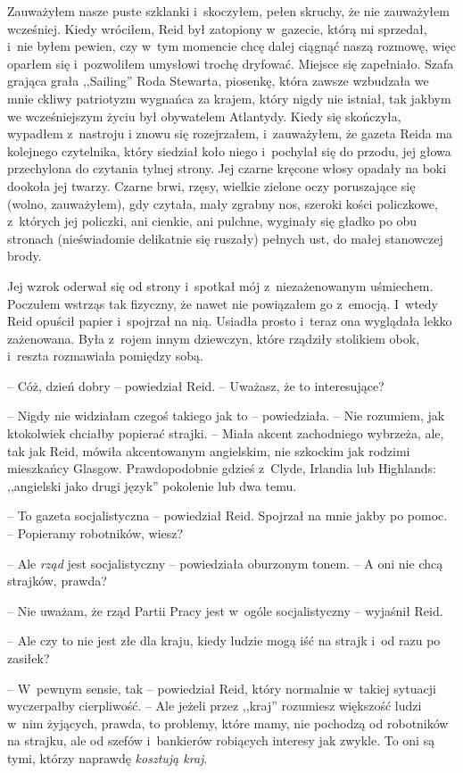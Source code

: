 \documentclass[oneside,polish,11pt,sfheadings]{mwbk}
\begin{document}
Zauważyłem nasze puste szklanki i~skoczyłem, pełen skruchy, że nie
zauważyłem wcześniej. Kiedy wróciłem, Reid był zatopiony w~gazecie,
którą mi sprzedał, i~nie byłem pewien, czy w~tym momencie chcę dalej
ciągnąć naszą rozmowę, więc oparłem się i~pozwoliłem umysłowi trochę
dryfować. Miejsce się zapełniało. Szafa grająca grała ,,Sailing'' Roda
Stewarta, piosenkę, która zawsze wzbudzała we mnie ckliwy patriotyzm
wygnańca za krajem, który nigdy nie istniał, tak jakbym we wcześniejszym
życiu był obywatelem Atlantydy. Kiedy się skończyła, wypadłem z~nastroju
i znowu się rozejrzałem, i~zauważyłem, że gazeta Reida ma kolejnego
czytelnika, który siedział koło niego i~pochylał się do przodu, jej
głowa przechylona do czytania tylnej strony. Jej czarne kręcone włosy
opadały na boki dookoła jej twarzy. Czarne brwi, rzęsy, wielkie zielone
oczy poruszające się (wolno, zauważyłem), gdy czytała, mały zgrabny nos,
szeroki kości policzkowe, z~których jej policzki, ani cienkie, ani
pulchne, wyginały się gładko po obu stronach (nieświadomie delikatnie
się ruszały) pełnych ust, do małej stanowczej brody.

Jej wzrok oderwał się od strony i~spotkał mój z~niezażenowanym
uśmiechem. Poczułem wstrząs tak fizyczny, że nawet nie powiązałem go z~emocją. I~wtedy Reid opuścił papier i~spojrzał na nią. Usiadła prosto i~teraz ona wyglądała lekko zażenowana. Była z~rojem innym dziewczyn,
które rządziły stolikiem obok, i~reszta rozmawiała pomiędzy sobą.

-- Cóż, dzień dobry -- powiedział Reid. -- Uważasz, że to interesujące?

-- Nigdy nie widziałam czegoś takiego jak to -- powiedziała. -- Nie
rozumiem, jak ktokolwiek chciałby popierać strajki. -- Miała akcent
zachodniego wybrzeża, ale, tak jak Reid, mówiła akcentowanym angielskim,
nie szkockim jak rodzimi mieszkańcy Glasgow. Prawdopodobnie gdzieś z~Clyde, Irlandia lub Highlands: ,,angielski jako drugi język'' pokolenie lub
dwa temu.

-- To gazeta socjalistyczna -- powiedział Reid. Spojrzał na mnie jakby po
pomoc. -- Popieramy robotników, wiesz?

-- Ale \emph{rząd} jest socjalistyczny -- powiedziała oburzonym tonem. -- A
oni nie chcą strajków, prawda?

-- Nie uważam, że rząd Partii Pracy jest w~ogóle socjalistyczny -- wyjaśnił Reid.

-- Ale czy to nie jest złe dla kraju, kiedy ludzie mogą iść na strajk i~od razu po zasiłek?

-- W~pewnym sensie, tak -- powiedział Reid, który normalnie w~takiej
sytuacji wyczerpałby cierpliwość. -- Ale jeżeli przez ,,kraj'' rozumiesz
większość ludzi w~nim żyjących, prawda, to problemy, które mamy, nie
pochodzą od robotników na strajku, ale od szefów i~bankierów robiących
interesy jak zwykle. To oni są tymi, którzy naprawdę \emph{kosztują
kraj}.
\end{document}
